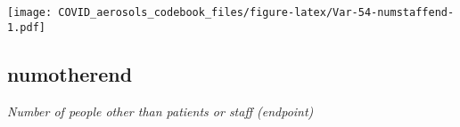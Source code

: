 \documentclass[]{article}
\begin{document}
\begin{minipage}{0.25 \textwidth}

\texttt{[image: COVID\_aerosols\_codebook\_files/figure-latex/Var-54-numstaffend-1.pdf]}

\end{minipage}

\noindent\makebox[\linewidth]{\rule{\textwidth}{0.4pt}}

\hypertarget{numotherend}{%
\subsection{numotherend}\label{numotherend}}

\emph{Number of people other than patients or staff (endpoint)}

\begin{minipage}{0.75 \textwidth}


\end{minipage}
\end{document}
